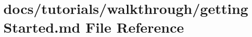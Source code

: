 \hypertarget{gettingStarted_8md}{}\section{docs/tutorials/walkthrough/getting\+Started.md File Reference}
\label{gettingStarted_8md}
